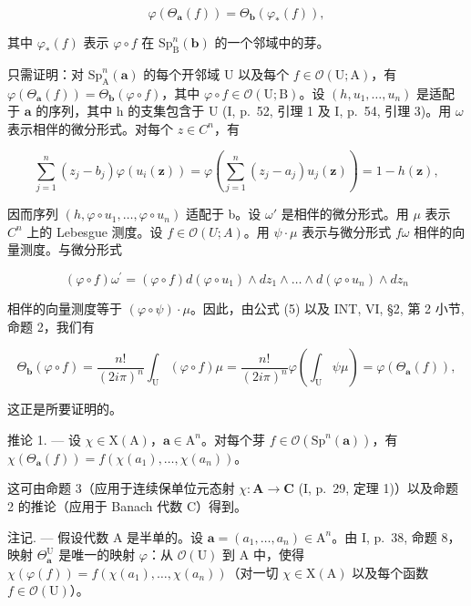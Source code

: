 \[
\varphi (\Theta_ {\boldsymbol {a}} (f)) = \Theta_ {\boldsymbol {b}} (\varphi_ {*} (f)),
\]

其中 \(\varphi_{*}(f)\) 表示 \(\varphi \circ f\) 在 \(\mathrm{Sp}_{\mathrm{B}}^{n}(\boldsymbol{b})\) 的一个邻域中的芽。

只需证明：对 \(\mathrm{Sp}_{\mathrm{A}}^{n}(\boldsymbol{a})\) 的每个开邻域 U 以及每个 \(f \in \mathcal{O}(\mathrm{U}; \mathrm{A})\)，有 \(\varphi(\Theta_{\boldsymbol{a}}(f)) = \Theta_{\boldsymbol{b}}(\varphi \circ f)\)，其中 \(\varphi \circ f \in \mathcal{O}(\mathrm{U}; \mathrm{B})\)。设 \((h, u_{1}, \ldots, u_{n})\) 是适配于 \(\boldsymbol{a}\) 的序列，其中 h 的支集包含于 U (I, p.~52, 引理 1 及 I, p.~54, 引理 3)。用 \(\omega\) 表示相伴的微分形式。对每个 \(z \in C^{n}\)，有

\[
\sum_ {j = 1} ^ {n} (z _ {j} - b _ {j}) \varphi (u _ {i} (\boldsymbol {z})) = \varphi \left(\sum_ {j = 1} ^ {n} (z _ {j} - a _ {j}) u _ {j} (\boldsymbol {z})\right) = 1 - h (\boldsymbol {z}),
\]

因而序列 \((h,\varphi\circ u_{1},\ldots,\varphi\circ u_{n})\) 适配于 b。设 \(\omega'\) 是相伴的微分形式。用 \(\mu\) 表示 \(C^{n}\) 上的 Lebesgue 测度。设 \(f\in\mathcal{O}(U;A)\)。用 \(\psi\cdot\mu\) 表示与微分形式 \(f\omega\) 相伴的向量测度。与微分形式

\[
(\varphi \circ f) \omega^ {\prime} = (\varphi \circ f) d (\varphi \circ u _ {1}) \wedge d z _ {1} \wedge \dots \wedge d (\varphi \circ u _ {n}) \wedge d z _ {n}
\]

相伴的向量测度等于 \((\varphi \circ \psi) \cdot \mu\)。因此，由公式 (5) 以及 INT, VI, §2, 第 2 小节, 命题 2，我们有

\[
\Theta_ {\boldsymbol {b}} (\varphi \circ f) = \frac {n !}{(2 i \pi) ^ {n}} \int_ {\mathrm{U}} (\varphi \circ f) \mu = \frac {n !}{(2 i \pi) ^ {n}} \varphi \left(\int_ {\mathrm{U}} \psi \mu\right) = \varphi (\Theta_ {\boldsymbol {a}} (f)),
\]

这正是所要证明的。

推论 1. --- 设 \(\chi \in \mathrm{X}(\mathrm{A})\)，\(\boldsymbol{a} \in \mathrm{A}^n\)。对每个芽 \(f \in \mathcal{O}(\mathrm{Sp}^n(\boldsymbol{a}))\)，有 \(\chi(\Theta_{\boldsymbol{a}}(f)) = f(\chi(a_1), \ldots, \chi(a_n))\)。

这可由命题 3（应用于连续保单位元态射 \(\chi\colon\mathbf{A}\to\mathbf{C}\) (I, p.~29, 定理 1)）以及命题 2 的推论（应用于 Banach 代数 C）得到。

注记. --- 假设代数 A 是半单的。设 \(\boldsymbol{a} = (a_{1}, \ldots, a_{n}) \in \mathrm{A}^{n}\)。由 I, p.~38, 命题 8，映射 \(\Theta_{\boldsymbol{a}}^{\mathrm{U}}\) 是唯一的映射 \(\varphi\)：从 \(\mathcal{O}(\mathrm{U})\) 到 A 中，使得 \(\chi(\varphi(f)) = f(\chi(a_{1}), \ldots, \chi(a_{n}))\)（对一切 \(\chi \in \mathrm{X}(\mathrm{A})\) 以及每个函数 \(f \in \mathcal{O}(\mathrm{U})\)）。

